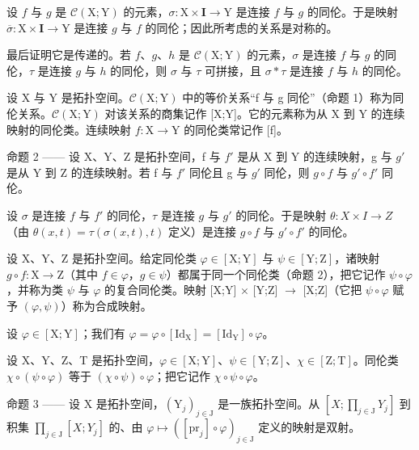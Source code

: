 设 \(f\) 与 \(g\) 是 \(\mathcal{C}(\mathrm{X};\mathrm{Y})\) 的元素，\(\sigma\colon\mathrm{X}\times\mathbf{I}\to\mathrm{Y}\) 是连接 \(f\) 与 \(g\) 的同伦。于是映射 \(\overline{\sigma}\colon\mathrm{X}\times\mathbf{I}\to\mathrm{Y}\) 是连接 \(g\) 与 \(f\) 的同伦；因此所考虑的关系是对称的。

最后证明它是传递的。若 \(f\)、\(g\)、\(h\) 是 \(\mathcal{C}(\mathrm{X};\mathrm{Y})\) 的元素，\(\sigma\) 是连接 \(f\) 与 \(g\) 的同伦，\(\tau\) 是连接 \(g\) 与 \(h\) 的同伦，则 \(\sigma\) 与 \(\tau\) 可拼接，且 \(\sigma*\tau\) 是连接 \(f\) 与 \(h\) 的同伦。

设 X 与 Y 是拓扑空间。\(\mathcal{C}(\mathrm{X};\mathrm{Y})\) 中的等价关系“f 与 g 同伦”（命题 1）称为同伦关系。\(\mathcal{C}(\mathrm{X};\mathrm{Y})\) 对该关系的商集记作 {[}X;Y{]}。它的元素称为从 X 到 Y 的连续映射的同伦类。连续映射 \(f\colon \mathrm{X}\to \mathrm{Y}\) 的同伦类常记作 {[}f{]}。

命题 2 —— 设 X、Y、Z 是拓扑空间，f 与 \(f'\) 是从 X 到 Y 的连续映射，g 与 \(g'\) 是从 Y 到 Z 的连续映射。若 f 与 \(f'\) 同伦且 g 与 \(g'\) 同伦，则 \(g \circ f\) 与 \(g' \circ f'\) 同伦。

设 \(\sigma\) 是连接 \(f\) 与 \(f'\) 的同伦，\(\tau\) 是连接 \(g\) 与 \(g'\) 的同伦。于是映射 \(\theta\colon X\times I\to Z\)（由 \(\theta(x,t)=\tau(\sigma(x,t),t)\) 定义）是连接 \(g\circ f\) 与 \(g'\circ f'\) 的同伦。

设 X、Y、Z 是拓扑空间。给定同伦类 \(\varphi \in [\mathrm{X};\mathrm{Y}]\) 与 \(\psi \in [\mathrm{Y};\mathrm{Z}]\)，诸映射 \(g \circ f: \mathrm{X} \to \mathrm{Z}\)（其中 \(f \in \varphi\)，\(g \in \psi\)）都属于同一个同伦类（命题 2），把它记作 \(\psi \circ \varphi\)，并称为类 \(\psi\) 与 \(\varphi\) 的复合同伦类。映射 {[}X;Y{]} \(\times\) {[}Y;Z{]} \(\to\) {[}X;Z{]}（它把 \(\psi \circ \varphi\) 赋予 \((\varphi,\psi)\)）称为合成映射。

设 \(\varphi\in[\mathrm{X};\mathrm{Y}]\)；我们有 \(\varphi=\varphi\circ[\mathrm{Id}_{\mathrm{X}}]=[\mathrm{Id}_{\mathrm{Y}}]\circ\varphi\)。

设 X、Y、Z、T 是拓扑空间，\(\varphi \in [\mathrm{X};\mathrm{Y}]\)、\(\psi \in [\mathrm{Y};\mathrm{Z}]\)、\(\chi \in [\mathrm{Z};\mathrm{T}]\)。同伦类 \(\chi \circ (\psi \circ \varphi)\) 等于 \((\chi \circ \psi) \circ \varphi\)；把它记作 \(\chi \circ \psi \circ \varphi\)。

命题 3 —— 设 X 是拓扑空间，\((\mathrm{Y}_{j})_{j\in\mathrm{J}}\) 是一族拓扑空间。从 \([X;\prod_{j\in\mathrm{J}}Y_{j}]\) 到积集 \(\prod_{j\in\mathrm{J}}[X;Y_{j}]\) 的、由 \(\varphi\mapsto([\mathrm{pr}_{j}]\circ\varphi)_{j\in\mathrm{J}}\) 定义的映射是双射。

